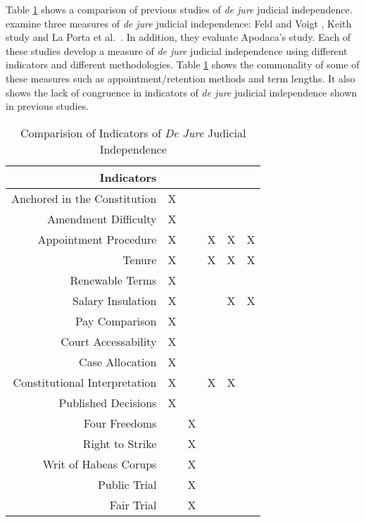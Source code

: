 \documentclass[JohnsonMADraft2.tex]{subfiles}
\begin{document}
Table \ref{otherindicators} shows a comparison of previous studies of \textit{de jure} judicial independence.  \citet{Rios2014} examine three measures of \textit{de jure} judicial independence: Feld and Voigt \citeyearpar{Feld2003}, Keith \citeyearpar{Keith2002a} study and La Porta et al.\ \citeyearpar{Laporta2004}.  In addition, they evaluate Apodaca's \citeyearpar{Apodaca2004} study.  Each of these studies develop a measure of \textit{de jure} judicial independence using different indicators and different methodologies.  Table \ref{otherindicators} shows the commonality of some of these measures such as appointment/retention methods and term lengths.  It also shows the lack of congruence in indicators of \textit{de jure} judicial independence shown in previous studies.

\begin{landscape}
	\begin{table}[!tbh]\centering\caption{Comparision of Indicators of \textit{De Jure} Judicial Independence}\label{otherindicators}\small
		\begin{tabular}{rccccc}\hline
			Indicators	&	\citet{Feld2003}	&	\citet{Keith2002a}	&	\citet{Laporta2004}	&	\citet{Rios2006}	&	\citet{Melton2014}	\\\hline
			Anchored in the Constitution	&	X	&		&		&		&		\\
			Amendment Difficulty	&	X	&		&		&		&		\\
			Appointment Procedure	&	X	&		&	X	&	X	&	X	\\
			Tenure	&	X	&		&	X	&	X	&	X	\\
			Renewable Terms	&	X	&		&		&		&		\\
			Salary Insulation	&	X	&		&		&	X	&	X	\\
			Pay Comparison	&	X	&		&		&		&		\\
			Court Accessability	&	X	&		&		&		&		\\
			Case Allocation	&	X	&		&		&		&		\\
			Constitutional Interpretation	&	X	&		&	X	&	X	&		\\
			Published Decisions	&	X	&		&		&		&		\\
			Four Freedoms	&		&	X	&		&		&		\\
			Right to Strike	&		&	X	&		&		&		\\
			Writ of Habeas Corups	&		&	X	&		&		&		\\
			Public Trial	&		&	X	&		&		&		\\
			Fair Trial	&		&	X	&		&		&		\\

\end{tabular}
\end{table}
\end{landscape}
\end{document}
